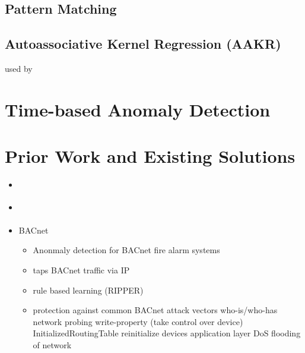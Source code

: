 	\subsection{Pattern Matching}
	\subsection{Autoassociative Kernel Regression (AAKR)}
		used by \textcite{Yang2006}

\section{Time-based Anomaly Detection}

\section{Prior Work and Existing Solutions}
\begin{itemize}
	\item \parencite{Yang2006}
	\item \parencite{Celeda2012}
	\item \textcite{Pan2014} BACnet
		\begin{itemize}
			\item Anonmaly detection for BACnet fire alarm systems
			\item taps BACnet traffic via IP
			\item rule based learning (RIPPER)
			\item protection against common BACnet attack vectors
				\subitem who-is/who-has network probing
				\subitem write-property (take control over device)
				\subitem InitializedRoutingTable
				\subitem reinitialize devices
				\subitem application layer DoS
				\subitem flooding of network
		\end{itemize}
\end{itemize}